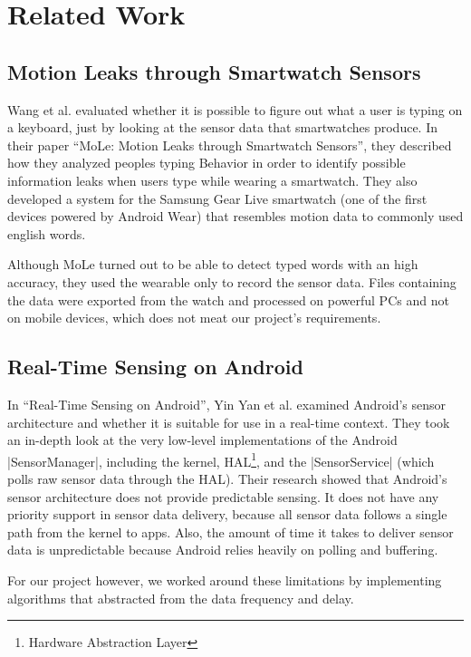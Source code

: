\section{Related Work}
\label{sec:relatedwork}

\subsection{Motion Leaks through Smartwatch Sensors}
Wang et al. evaluated whether it is possible to figure out what a user is typing on a keyboard, just by looking at the sensor data that smartwatches produce.
In their paper ``MoLe: Motion Leaks through Smartwatch Sensors''\cite{paper:motionleaks}, they described how they analyzed peoples typing Behavior in order to identify possible information leaks when users type while wearing a smartwatch.
They also developed a system for the Samsung Gear Live smartwatch (one of the first devices powered by Android Wear) that resembles motion data to commonly used english words.

Although MoLe turned out to be able to detect typed words with an high accuracy, they used the wearable only to record the sensor data.
Files containing the data were exported from the watch and processed on powerful PCs and not on mobile devices, which does not meat our project's requirements.

\subsection{Real-Time Sensing on Android}
In ``Real-Time Sensing on Android''\cite{paper:realtimesensing}, Yin Yan et al. examined Android’s sensor architecture and whether it is suitable for use in a real-time context.
They took an in-depth look at the very low-level implementations of the Android |SensorManager|\cite{androiddocs:sensormanager}, including the kernel, HAL\footnote{Hardware Abstraction Layer}, and the |SensorService| (which polls raw sensor data through the HAL).
Their research showed that Android's sensor architecture does not provide predictable sensing.
It does not have any priority support in sensor data delivery, because all sensor data follows a single path from the kernel to apps.
Also, the amount of time it takes to deliver sensor data is unpredictable because Android relies heavily on polling and buffering.

For our project however, we worked around these limitations by implementing algorithms that abstracted from the data frequency and delay.

